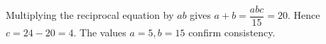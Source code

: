 Multiplying the reciprocal equation by $ab$ gives $a+b=\dfrac{abc}{15}=20$. Hence $c=24-20=\boxed4$. The values $a=5,b=15$ confirm consistency.
